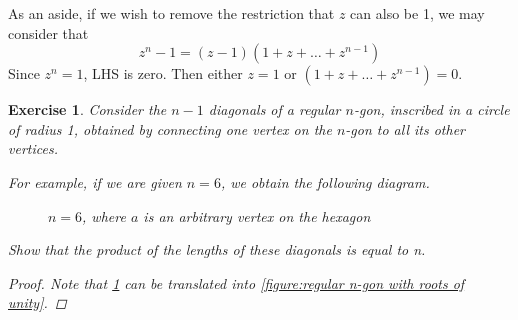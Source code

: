 \documentclass[11pt, oneside]{book}
\theoremstyle{break}
\newtheorem*{proof}{Proof}
\newtheorem{ex}{Exercise}[section]
\begin{document}
As an aside, if we wish to remove the restriction that $z$ can also be 1, we may consider that
\begin{equation*}
	z^n - 1 = (z - 1)(1 + z + \hdots + z^{n - 1})
\end{equation*}
Since $z^n = 1$, LHS is zero. Then either $z = 1$ or $(1 + z + \hdots + z^{n - 1}) = 0$.

\begin{ex}
	Consider the $n - 1$ diagonals of a regular $n$-gon, inscribed in a circle of radius 1, obtained by connecting one vertex on the $n$-gon to all its other vertices.

	For example, if we are given $n = 6$, we obtain the following diagram.

	\begin{figure}[H]
		\begin{center}
		\end{center}
		\caption[loftitle]{$n = 6$, where $a$ is an arbitrary vertex on the hexagon}
		\label{figure:regular hexagon with one point connected to all other vertices}
	\end{figure}

	Show that the product of the lengths of these diagonals is equal to n.

	\begin{proof}
		Note that \cref{figure:regular hexagon with one point connected to all other vertices} can be translated into \cref{figure:regular n-gon with roots of unity}.


\end{proof}
\end{ex}
\end{document}
